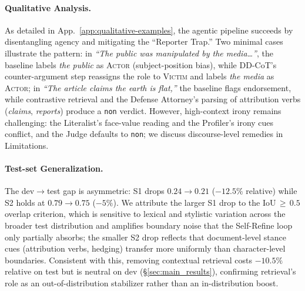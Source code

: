 \documentclass[11pt]{article}
\begin{document}
\paragraph{Qualitative Analysis.} As detailed in App.~\ref{app:qualitative-examples}, the agentic pipeline succeeds by
disentangling agency and mitigating the ``Reporter Trap.'' Two minimal cases illustrate the pattern: in \textit{``The public was manipulated by the media\ldots''}, the baseline labels \textit{the public} as \textsc{Actor} (subject-position bias), while DD-CoT's counter-argument step reassigns the role to \textsc{Victim} and labels \textit{the media} as \textsc{Actor}; in \textit{``The article claims the earth is flat,''} the baseline flags endorsement, while contrastive retrieval and the Defense Attorney's parsing of attribution verbs (\textit{claims}, \textit{reports}) produce a \texttt{non} verdict. However, high-context irony remains challenging: the Literalist's face-value reading and the Profiler's irony cues conflict, and the Judge defaults to \texttt{non}; we discuss discourse-level remedies in Limitations.

\paragraph{Test-set Generalization.} The dev$\to$test gap is asymmetric: S1 drops $0.24\to0.21$ ($-12.5\%$ relative) while S2 holds at $0.79\to0.75$ ($-5\%$). We attribute the larger S1 drop to the IoU$\,\geq\,0.5$ overlap criterion, which is sensitive to lexical and stylistic variation across the broader test distribution and amplifies boundary noise that the Self-Refine loop only partially absorbs; the smaller S2 drop reflects that document-level stance cues (attribution verbs, hedging) transfer more uniformly than character-level boundaries. Consistent with this, removing contextual retrieval costs $-10.5\%$ relative on test but is neutral on dev (\S\ref{sec:main_results}), confirming retrieval's role as an out-of-distribution stabilizer rather than an in-distribution boost.
\end{document}
